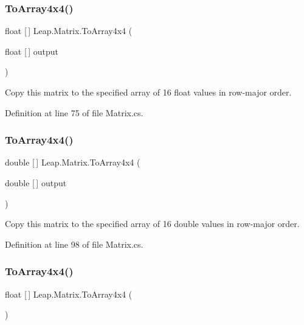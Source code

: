 \subsubsection{\texorpdfstring{ToArray4x4()}{ToArray4x4()}\hspace{0.1cm}{\footnotesize\ttfamily [1/3]}}
{\footnotesize\ttfamily float \mbox{[}$\,$\mbox{]} Leap.\+Matrix.\+To\+Array4x4 (\begin{DoxyParamCaption}\item[{float \mbox{[}$\,$\mbox{]}}]{output }\end{DoxyParamCaption})}



Copy this matrix to the specified array of 16 float values in row-\/major order. 



Definition at line 75 of file Matrix.\+cs.

\mbox{\label{struct_leap_1_1_matrix_a71e674a52a30d274a48980f86bfe0115}} 
\subsubsection{\texorpdfstring{ToArray4x4()}{ToArray4x4()}\hspace{0.1cm}{\footnotesize\ttfamily [2/3]}}
{\footnotesize\ttfamily double \mbox{[}$\,$\mbox{]} Leap.\+Matrix.\+To\+Array4x4 (\begin{DoxyParamCaption}\item[{double \mbox{[}$\,$\mbox{]}}]{output }\end{DoxyParamCaption})}



Copy this matrix to the specified array of 16 double values in row-\/major order. 



Definition at line 98 of file Matrix.\+cs.

\mbox{\label{struct_leap_1_1_matrix_a211644064b986fe18caa2902150ad9aa}} 
\subsubsection{\texorpdfstring{ToArray4x4()}{ToArray4x4()}\hspace{0.1cm}{\footnotesize\ttfamily [3/3]}}
{\footnotesize\ttfamily float \mbox{[}$\,$\mbox{]} Leap.\+Matrix.\+To\+Array4x4 (\begin{DoxyParamCaption}{ }\end{DoxyParamCaption})}



